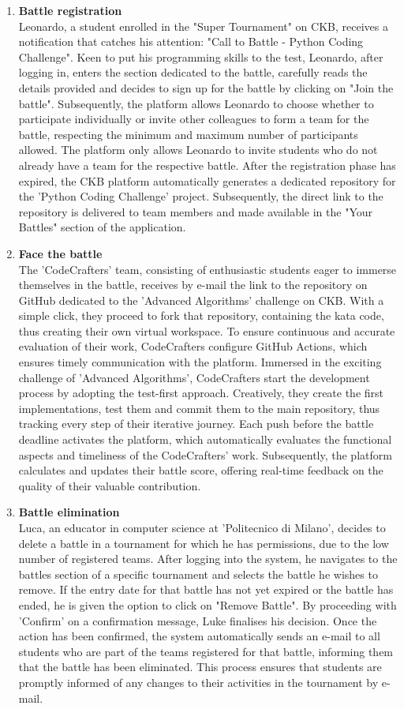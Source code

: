 \begin{enumerate}[label=\textbf{\Alph*}.]
\item \textbf{Battle registration} \\
Leonardo, a student enrolled in the "Super Tournament" on CKB, receives a notification that catches his attention: "Call to Battle - Python Coding Challenge". Keen to put his programming skills to the test, Leonardo, after logging in, enters the section dedicated to the battle, carefully reads the details provided and decides to sign up for the battle by clicking on "Join the battle". Subsequently, the platform allows Leonardo to choose whether to participate individually or invite other colleagues to form a team for the battle, respecting the minimum and maximum number of participants allowed. The platform only allows Leonardo to invite students who do not already have a team for the respective battle. After the registration phase has expired, the CKB platform automatically generates a dedicated repository for the 'Python Coding Challenge' project. Subsequently, the direct link to the repository is delivered to team members and made available in the "Your Battles" section of the application.
\item  \textbf{Face the battle} \\
The 'CodeCrafters' team, consisting of enthusiastic students eager to immerse themselves in the battle, receives by e-mail the link to the repository on GitHub dedicated to the 'Advanced Algorithms' challenge on CKB. With a simple click, they proceed to fork that repository, containing the kata code, thus creating their own virtual workspace. To ensure continuous and accurate evaluation of their work, CodeCrafters configure GitHub Actions, which ensures timely communication with the platform.
Immersed in the exciting challenge of 'Advanced Algorithms', CodeCrafters start the development process by adopting the test-first approach. Creatively, they create the first implementations, test them and commit them to the main repository, thus tracking every step of their iterative journey. Each push before the battle deadline activates the platform, which automatically evaluates the functional aspects and timeliness of the CodeCrafters' work. Subsequently, the platform calculates and updates their battle score, offering real-time feedback on the quality of their valuable contribution.
\item \textbf{Battle elimination} \\
Luca, an educator in computer science at  'Politecnico di Milano', decides to delete a battle in a tournament for which he has permissions, due to the low number of registered teams. After logging into the system, he navigates to the battles section of a specific tournament and selects the battle he wishes to remove. If the entry date for that battle has not yet expired or the battle has ended, he is given the option to click on "Remove Battle". By proceeding with 'Confirm' on a confirmation message, Luke finalises his decision. Once the action has been confirmed, the system automatically sends an e-mail to all students who are part of the teams registered for that battle, informing them that the battle has been eliminated. This process ensures that students are promptly informed of any changes to their activities in the tournament by e-mail.

\end{enumerate}
